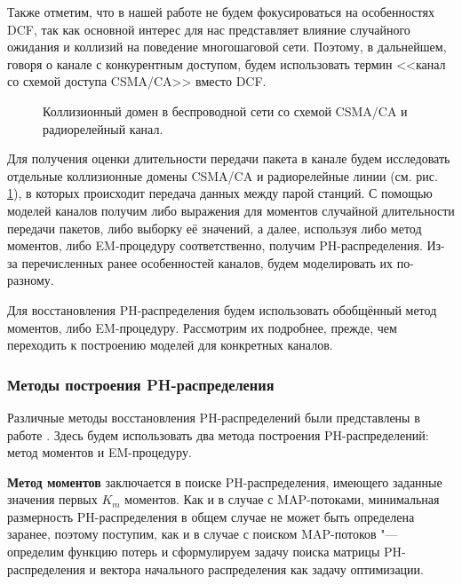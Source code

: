 Также отметим, что в нашей работе не будем фокусироваться на особенностях DCF, так как основной интерес для нас представляет влияние случайного ожидания и коллизий на поведение многошаговой сети. Поэтому, в дальнейшем, говоря о канале с конкурентным доступом, будем использовать термин <<канал со схемой доступа CSMA/CA>> вместо DCF.

\begin{figure}[h]
  \caption{Коллизионный домен в беспроводной сети со схемой CSMA/CA и радиорелейный канал.}
  \label{fig:ch4_collision_domains}
\end{figure}

Для получения оценки длительности передачи пакета в канале будем исследовать отдельные коллизионные домены CSMA/CA и радиорелейные линии (см. рис. \ref{fig:ch4_collision_domains}), в которых происходит передача данных между парой станций. С помощью моделей каналов получим либо выражения для моментов случайной длительности передачи пакетов, либо выборку её значений, а далее, используя либо метод моментов, либо EM-процедуру соответственно, получим PH-распределения. Из-за перечисленных ранее особенностей каналов, будем моделировать их по-разному.

Для восстановления PH-распределения будем использовать обобщённый метод моментов, либо EM-процедуру. Рассмотрим их подробнее, прежде, чем переходить к построению моделей для конкретных каналов.



\subsubsection{Методы построения PH-распределения}

Различные методы восстановления PH-распределений были представлены в работе \cite{QS_ITMM2017}. Здесь будем использовать два метода построения PH-распределений: метод моментов и EM-процедуру.

\textbf{Метод моментов} заключается в поиске PH-распределения, имеющего заданные значения первых $K_m$ моментов. Как и в случае с MAP-потоками, минимальная размерность PH-распределения в общем случае не может быть определена заранее, поэтому поступим, как и в случае с поиском MAP-потоков  "--- определим функцию потерь и сформулируем задачу поиска матрицы PH-распределения и вектора начального распределения как задачу оптимизации.


